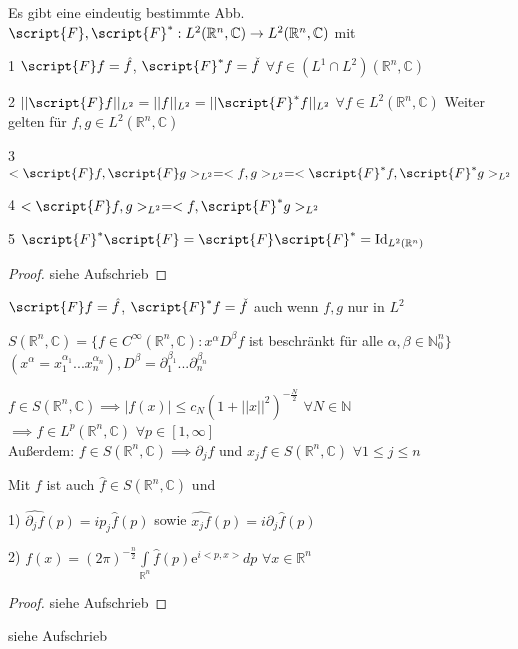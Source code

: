 \begin{theorem}
	Es gibt eine eindeutig bestimmte Abb. $\script{F}, \script{F}^\ast: L^2(\mathbb{R}^n,\mathbb{C}) \to L^2(\mathbb{R}^n,\mathbb{C})$ mit
	\item[1] $\script{F}f = \hat{f}$, $\script{F}^\ast f = \check{f}$ $\forall f\in (L^1\cap L^2)(\mathbb{R}^n,\mathbb{C})$
	\item[2] $||\script{F}f||_{L^2} = ||f||_{L^2} = ||\script{F}^\ast f||_{L^2}$ $\forall f\in L^2(\mathbb{R}^n,\mathbb{C})$ 
	Weiter gelten für $f,g\in L^2(\mathbb{R}^n,\mathbb{C})$ 
	\item[3] $<\script{F}f,\script{F}g>_{L^2} = <f,g>_{L^2} = <\script{F}^\ast f, \script{F}^\ast g>_{L^2}$
	\item[4] $<\script{F}f,g> _{L^2} = <f,\script{F}^\ast g>_{L^2}$
	\item[5] $\script{F}^\ast \script{F} = \script{F} \script{F}^\ast = \text{Id}_{L^2(\mathbb{R}^n)}$
\end{theorem}
\begin{proof}
	siehe Aufschrieb
\end{proof}

\begin{notation} 
	$\script{F}f = \hat{f}$, $\script{F}^\ast f = \check{f}$ auch wenn $f,g$ nur in $L^2$
\end{notation}

\begin{definition}
	$S(\mathbb{R}^n,\mathbb{C}) = \{f\in C^\infty (\mathbb{R}^n,\mathbb{C}): x^\alpha D^\beta f$ ist beschränkt für alle $\alpha,\beta \in \mathbb{N}^n_0 \}$ \\
	$(x^\alpha = x_1^{\alpha_1}... x_n^{\alpha_n}), D^\beta = \partial_1^{\beta_1}...\partial_n^{\beta_n}$
\end{definition}

\begin{remark}
	$f\in S(\mathbb{R}^n,\mathbb{C}) \implies |f(x)| \leq c_N (1+||x||^2)^{-\frac{N}{2}}$ $\forall N\in \mathbb{N}$ \\
	$\implies f\in L^p(\mathbb{R}^n,\mathbb{C})$ $\forall p\in [1,\infty]$ \\
	Außerdem: $f\in S(\mathbb{R}^n,\mathbb{C}) \implies \partial_j f$ und $x_jf \in S(\mathbb{R}^n,\mathbb{C})$ $\forall 1\leq j \leq n$
\end{remark}

\begin{theorem}
	Mit $f$ ist auch $\hat{f}\in S(\mathbb{R}^n,\mathbb{C})$ und 
	\item[1)] $\widehat{\partial_j f}(p) = i p_j \hat{f}(p)$ sowie $\widehat{x_j f}(p) = i \partial_j \hat{f}(p)$
	\item[2)] $f(x) = (2\pi)^{-\frac{n}{2}}\int\limits_{\mathbb{R}^n} \hat{f}(p) \text{e}^{i<p,x>}dp$ $\forall x\in \mathbb{R}^n$
\end{theorem}
\begin{proof}
	siehe Aufschrieb
\end{proof}

\begin{example}
	siehe Aufschrieb
\end{example}